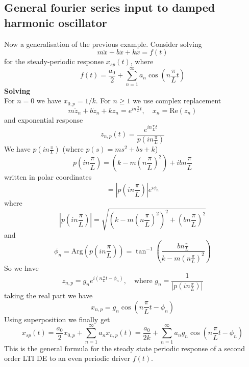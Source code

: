 \documentclass{report}
\begin{document}
\subsection{General fourier series input to damped harmonic oscillator}
Now a generalisation of the previous example. Consider solving 
\begin{equation*}
m\ddot{x}+b\dot{x}+kx=f(t)
\end{equation*}
for the steady-periodic response $x_{sp}(t)$, where 
\begin{equation*}
f(t)=\frac{a_0}{2}+\sum^\infty_{n=1}a_n\cos\left(n\frac{\pi}{L}t\right)
\end{equation*}
\textbf{Solving}\\
For $n=0$ we have $x_{0,p}=1/k$. For $n\geq1$ we use complex replacement
\begin{equation*}
m\ddot{z}_n+b\dot{z}_n+kz_n=e^{in\frac{\pi}{L}t},\quad x_n=\text{Re}(z_n)
\end{equation*}
and exponential response
\begin{equation*}
z_{n,p}(t)=\frac{e^{in\frac{\pi}{L}t}}{p\left(in\frac{\pi}{L}\right)}
\end{equation*}
We have $p\left(in\frac{\pi}{L}\right)$ (where $p(s)=ms^2+bs+k$)
\begin{equation*}
p\left(in\frac{\pi}{L}\right)=\left(k-m\left(n\frac{\pi}{L}\right)^2\right)+ibn\frac{\pi}{L}
\end{equation*}
written in polar coordinates
\begin{equation*}
=\left|p\left(in\frac{\pi}{L}\right)\right|e^{i\phi_n}
\end{equation*}
where
\begin{equation*}
\left|p\left(in\frac{\pi}{L}\right)\right|=\sqrt{
\left(k-m\left(n\frac{\pi}{L}\right)^2\right)^2+\left(bn\frac{\pi}{L}\right)^2}
\end{equation*}
and
\begin{equation*}
\phi_n=\text{Arg}\left(p\left(in\frac{\pi}{L}\right)\right)
=\tan^{-1}\left(\frac{bn\frac{\pi}{L}}{k-m\left(n\frac{\pi}{L}\right)^2}\right)
\end{equation*}
So we have
\begin{equation*}
z_{n,p}=g_ne^{i\left(n\frac{\pi}{L}t-\phi_n\right)},\quad\text{where }
g_n=\frac{1}{\left|p\left(in\frac{\pi}{L}\right)\right|}
\end{equation*}
taking the real part we have
\begin{equation*}
x_{n,p}=g_n\cos\left(n\frac{\pi}{L}t-\phi_n\right)
\end{equation*}
Using superposition we finally get
\begin{equation*}
x_{sp}(t)=\frac{a_0}{2}x_{0,p}+\sum^\infty_{n=1}a_nx_{n,p}(t)=\frac{a_0}{2k}+\sum^{\infty}_{n=1}a_ng_n\cos\left(
n\frac{\pi}{L}t-\phi_n\right)
\end{equation*}
This is the general formula for the steady state periodic response of a second order LTI DE to an even periodic 
driver $f(t)$.
\newpage
\end{document}
